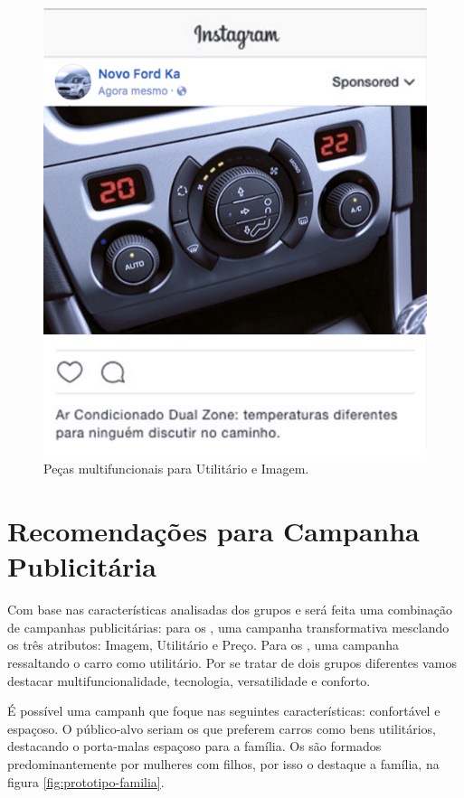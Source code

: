 \begin{figure}
\begin{centering}
{\begin{centering}
\includegraphics[height=0.34\textheight]{Imagens/p1_interior_painel}
\par\end{centering}
}
\par\end{centering}
\caption{Peças multifuncionais para Utilitário e Imagem.}
\end{figure}


\section{Recomendações para Campanha Publicitária}

Com base nas características analisadas dos grupos \nomeCa{} e \nomeCd{}
será feita uma combinação de campanhas publicitárias: para os \nomeCa{},
uma campanha transformativa mesclando os três atributos: Imagem, Utilitário
e Preço. Para os \nomeCd{}, uma campanha ressaltando o carro como
utilitário. Por se tratar de dois grupos diferentes vamos destacar
multifuncionalidade, tecnologia, versatilidade e conforto.

É possível uma campanh que foque nas seguintes características: confortável
e espaçoso. O público-alvo seriam os \nomeCd{} que preferem carros
como bens utilitários, destacando o porta-malas espaçoso para a família.
Os \nomeCd{} são formados predominantemente por mulheres com filhos,
por isso o destaque a família, na figura \ref{fig:prototipo-familia}.

